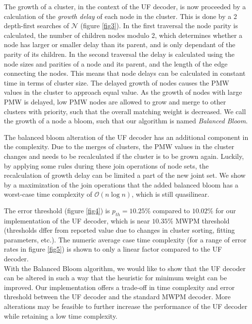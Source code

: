 \documentclass[10pt, a4paper, twoside, titlepage, usenames,dvipsnames]{report}
\begin{document}
The growth of a cluster, in the context of the UF decoder, is now proceeded by a calculation of the \emph{growth delay} of each node in the cluster. This is done by a 2 depth-first searches of $\mathcal{N}$ (figure \ref{fig3}). In the first traversal the node parity is calculated, the number of children nodes modulo 2, which determines whether a node has larger or smaller delay than its parent, and is only dependant of the parity of its children. In the second traversal the delay is calculated using the node sizes and parities of a node and its parent, and the length of the edge connecting the nodes. This means that node delays can be calculated in constant time in terms of cluster size. The delayed growth of nodes causes the PMW values in the cluster to approach equal value. As the growth of nodes with large PMW is delayed, low PMW nodes are allowed to grow and merge to other clusters with priority, such that the overall matching weight is decreased. We call the growth of a node a bloom, such that our algorithm is named \emph{Balanced Bloom}.

The balanced bloom alteration of the UF decoder has an additional component in the complexity. Due to the merges of clusters, the PMW values in the cluster changes and needs to be recalculated if the cluster is to be grown again. Luckily, by applying some rules during these join operations of node sets, the recalculation of growth delay can be limited a part of the new joint set. We show by a maximization of the join operations that the added balanced bloom has a worst-case time complexity of $\mathcal{O}(n \log n)$, which is still quasilinear.

The error threshold (figure \ref{fig4}) is $p_{th} = 10.25\%$ compared to $10.02\%$ for our implementation of the UF decoder, which is near $10.35\%$ MWPM threshold (thresholds dffer from reported value due to changes in cluster sorting, fitting parameters, etc.). The numeric average case time complexity (for a range of error rates in figure \ref{fig5}) is shown to only a linear factor compared to the UF decoder.\\

With the Balanced Bloom algorithm, we would like to show that the UF decoder can be altered in such a way that the heuristic for minimum weight can be improved. Our implementation offers a trade-off in time complexity and error threshold between the UF decoder and the standard MWPM decoder. More alterations may be feasible to further increase the performance of the UF decoder while retaining a low time complexity.
\end{document}

